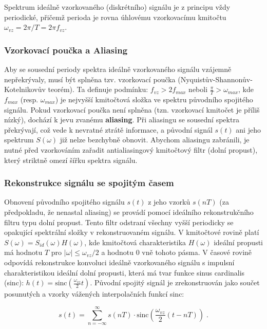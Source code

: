         Spektrum ideálně vzorkovaného (diskrétního) signálu je z principu vždy periodické, přičemž perioda je rovna úhlovému vzorkovacímu kmitočtu $\omega_{vz} = 2\pi/T = 2\pi f_{vz}$.
    
    \subsubsection{Vzorkovací poučka a Aliasing} 
        Aby se sousední periody spektra ideálně vzorkovaného signálu vzájemně nepřekrývaly, musí být splněna tzv. vzorkovací poučka (Nyquistův-Shannonův-Kotelnikovův teorém). Ta definuje podmínku: $f_{vz} > 2f_{max}$ neboli $\frac{\pi}{T} > \omega_{max}$, kde $f_{max}$ (resp. $\omega_{max}$) je nejvyšší kmitočtová složka ve spektru původního spojitého signálu. Pokud vzorkovací poučka není splněna (tzn. vzorkovací kmitočet je příliš nízký), dochází k jevu zvanému \textbf{aliasing}. Při aliasingu se sousední spektra překrývají, což vede k nevratné ztrátě informace, a původní signál $s(t)$ ani jeho spektrum $S(\omega)$ již nelze bezchybně obnovit. Abychom aliasingu zabránili, je nutné před vzorkováním zařadit antialiasingový kmitočtový filtr (dolní propust), který striktně omezí šířku spektra signálu.

    \subsubsection{Rekonstrukce signálu se spojitým časem} 
        Obnovení původního spojitého signálu $s(t)$ z jeho vzorků $s(nT)$ (za předpokladu, že nenastal aliasing) se provádí pomocí ideálního rekonstrukčního filtru typu dolní propust. Tento filtr odstraní všechny vyšší periodicky se opakující spektrální složky v rekonstruovaném signálu. V kmitočtové rovině platí $S(\omega) = S_{id}(\omega)H(\omega)$, kde kmitočtová charakteristika $H(\omega)$ ideální propusti má hodnotu $T$ pro $|\omega| \le \omega_{vz}/2$ a hodnotu 0 vně tohoto pásma. V časové rovině odpovídá rekonstrukce konvoluci ideálně vzorkovaného signálu s impulsní charakteristikou ideální dolní propusti, která má tvar funkce sinus cardinalis (sinc): $h(t) = \text{sinc}\left(\frac{\omega_{vz}}{2}t\right)$. Původní spojitý signál je zrekonstruován jako součet posunutých a vzorky vážených interpolačních funkcí sinc:

        \begin{equation*}
        s(t) = \sum_{n=-\infty}^{\infty} s(nT) \cdot \text{sinc}\left(\frac{\omega_{vz}}{2}(t - nT)\right) \;.
        \end{equation*}


